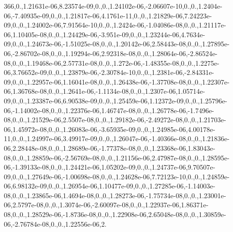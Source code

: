 {366,0.,1.\-21631e-\/06,8.\-23574e-\/09,0.,0.,1.\-24102e-\/06,-\/2.\-06607e-\/10,0.,0.,1.\-2404e-\/06,-\/7.\-40935e-\/09,0.,0.,1.\-21817e-\/06,4.\-1761e-\/11,0.,0.,1.\-21829e-\/06,7.\-24223e-\/09,0.,0.,1.\-24002e-\/06,7.\-91564e-\/10,0.,0.,1.\-2424e-\/06,-\/1.\-04086e-\/08,0.,0.,1.\-21117e-\/06,1.\-10405e-\/08,0.,0.,1.\-24429e-\/06,-\/3.\-951e-\/09,0.,0.,1.\-23244e-\/06,4.\-7634e-\/09,0.,0.,1.\-24673e-\/06,-\/1.\-51025e-\/08,0.,0.,1.\-20142e-\/06,2.\-58443e-\/08,0.,0.,1.\-27895e-\/06,-\/2.\-86702e-\/08,0.,0.,1.\-19294e-\/06,2.\-92318e-\/08,0.,0.,1.\-28064e-\/06,-\/2.\-86524e-\/08,0.,0.,1.\-19468e-\/06,2.\-57731e-\/08,0.,0.,1.\-272e-\/06,-\/1.\-48355e-\/08,0.,0.,1.\-2275e-\/06,3.\-76652e-\/09,0.,0.,1.\-23879e-\/06,-\/2.\-30784e-\/10,0.,0.,1.\-2381e-\/06,-\/2.\-84331e-\/09,0.,0.,1.\-22957e-\/06,1.\-16041e-\/08,0.,0.,1.\-26438e-\/06,-\/1.\-37708e-\/08,0.,0.,1.\-22307e-\/06,1.\-36768e-\/08,0.,0.,1.\-2641e-\/06,-\/1.\-1134e-\/08,0.,0.,1.\-2307e-\/06,1.\-05714e-\/09,0.,0.,1.\-23387e-\/06,6.\-90538e-\/09,0.,0.,1.\-25459e-\/06,1.\-12372e-\/09,0.,0.,1.\-25796e-\/06,-\/1.\-14002e-\/08,0.,0.,1.\-22376e-\/06,1.\-46747e-\/08,0.,0.,1.\-26778e-\/06,-\/1.\-7496e-\/08,0.,0.,1.\-21529e-\/06,2.\-5507e-\/08,0.,0.,1.\-29182e-\/06,-\/2.\-49272e-\/08,0.,0.,1.\-21703e-\/06,1.\-45972e-\/08,0.,0.,1.\-26083e-\/06,-\/3.\-65935e-\/09,0.,0.,1.\-24985e-\/06,4.\-00178e-\/11,0.,0.,1.\-24997e-\/06,3.\-49917e-\/09,0.,0.,1.\-26047e-\/06,-\/1.\-40366e-\/08,0.,0.,1.\-21836e-\/06,2.\-28448e-\/08,0.,0.,1.\-28689e-\/06,-\/1.\-77378e-\/08,0.,0.,1.\-23368e-\/06,1.\-83043e-\/08,0.,0.,1.\-28859e-\/06,-\/2.\-56769e-\/08,0.,0.,1.\-21156e-\/06,2.\-47987e-\/08,0.,0.,1.\-28595e-\/06,-\/1.\-39133e-\/08,0.,0.,1.\-24421e-\/06,1.\-05202e-\/09,0.,0.,1.\-24737e-\/06,9.\-70507e-\/09,0.,0.,1.\-27649e-\/06,-\/1.\-00698e-\/08,0.,0.,1.\-24628e-\/06,7.\-72123e-\/10,0.,0.,1.\-24859e-\/06,6.\-98132e-\/09,0.,0.,1.\-26954e-\/06,1.\-10477e-\/09,0.,0.,1.\-27285e-\/06,-\/1.\-14003e-\/08,0.,0.,1.\-23865e-\/06,1.\-4694e-\/08,0.,0.,1.\-28273e-\/06,-\/1.\-75734e-\/08,0.,0.,1.\-23001e-\/06,2.\-5797e-\/08,0.,0.,1.\-3074e-\/06,-\/2.\-60097e-\/08,0.,0.,1.\-22937e-\/06,1.\-86371e-\/08,0.,0.,1.\-28529e-\/06,-\/1.\-8736e-\/08,0.,0.,1.\-22908e-\/06,2.\-65048e-\/08,0.,0.,1.\-30859e-\/06,-\/2.\-76784e-\/08,0.,0.,1.\-22556e-\/06,2.}
